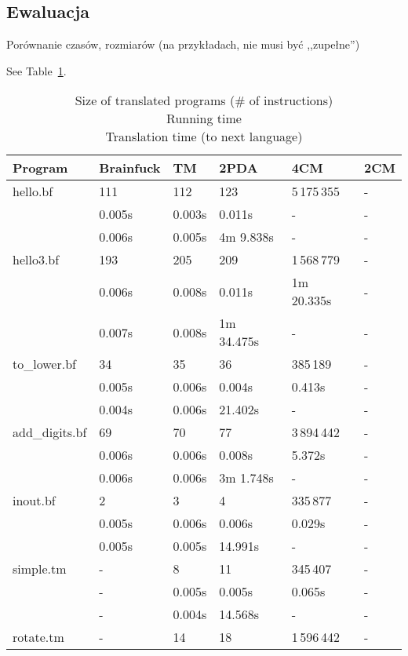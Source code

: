 \documentclass[english,shortabstract,mgr]{iithesis}
\begin{document}
\newpage

\subsection{Ewaluacja}

Porównanie czasów, rozmiarów (na przykładach, nie musi być ,,zupełne'')

See Table~\ref{t:my-label}.

\begin{table}[]
\centering
\caption{
Size of translated programs (\# of instructions)\\
Running time \\
Translation time (to next language)\\
}
\begin{center}
\label{t:my-label}
\begin{tabular}{llllll}
Program & Brainfuck & TM & 2PDA & 4CM & 2CM \\
\hline
hello.bf & 111 & 112 & 123 & 5\,175\,355 & -\\
 & 0.005s & 0.003s & 0.011s & - & - \\
 & 0.006s & 0.005s & 4m 9.838s & - & - \\
\hline
hello3.bf & 193 & 205 & 209 & 1\,568\,779 & -\\
 & 0.006s & 0.008s & 0.011s & 1m 20.335s & - \\
 & 0.007s & 0.008s & 1m 34.475s & - & - \\
\hline
to\_lower.bf & 34 & 35 & 36 & 385\,189 & -\\
 & 0.005s & 0.006s & 0.004s & 0.413s & - \\
 & 0.004s & 0.006s & 21.402s & - & - \\
\hline
add\_digits.bf & 69 & 70 & 77 & 3\,894\,442 & -\\
 & 0.006s & 0.006s & 0.008s & 5.372s & - \\
 & 0.006s & 0.006s & 3m 1.748s & - & - \\
\hline
inout.bf & 2 & 3 & 4 & 335\,877 & -\\
 & 0.005s & 0.006s & 0.006s & 0.029s & - \\
 & 0.005s & 0.005s & 14.991s & - & - \\
\hline
simple.tm & - & 8 & 11 & 345\,407 & -\\
 & - & 0.005s & 0.005s & 0.065s & - \\
 & - & 0.004s & 14.568s & - & - \\
\hline
rotate.tm & - & 14 & 18 & 1\,596\,442 & -\\

\end{tabular}
\end{center}
\end{table}
\end{document}
